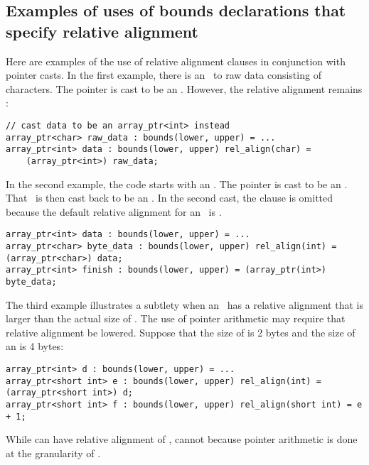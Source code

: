 \subsection{Examples of uses of bounds declarations that specify relative alignment}

Here are examples of the use of relative alignment clauses in
conjunction with pointer casts. In the first example, there is an
\arrayptr\ to raw data consisting of characters. The pointer is
cast to be an \arrayptrint . However,
the relative alignment remains :

\begin{lstlisting}
// cast data to be an array_ptr<int> instead
array_ptr<char> raw_data : bounds(lower, upper) = ...
array_ptr<int> data : bounds(lower, upper) rel_align(char) =
    (array_ptr<int>) raw_data;
\end{lstlisting}

In the second example, the code starts with an
\arrayptrint. The pointer is cast to
be an \arrayptrchar. That
\arrayptr\ is then cast back to be an
\arrayptrint . In the second cast, the
 clause is omitted because the default relative
alignment for an \arrayptrint\ is
.

\begin{lstlisting}
array_ptr<int> data : bounds(lower, upper) = ...
array_ptr<char> byte_data : bounds(lower, upper) rel_align(int) = (array_ptr<char>) data;
array_ptr<int> finish : bounds(lower, upper) = (array_ptr(int>) byte_data;
\end{lstlisting}

The third example illustrates a subtlety when an
\arrayptrT\ has a
relative alignment that is larger than the actual size of . The
use of pointer arithmetic may require that relative alignment be
lowered. Suppose that the size of  is 2 bytes and the
size of an  is 4 bytes:

\begin{lstlisting}
array_ptr<int> d : bounds(lower, upper) = ...
array_ptr<short int> e : bounds(lower, upper) rel_align(int) = (array_ptr<short int>) d;
array_ptr<short int> f : bounds(lower, upper) rel_align(short int) = e + 1;
\end{lstlisting}

While  can have relative alignment of , 
cannot because pointer arithmetic is done at the granularity of
.

